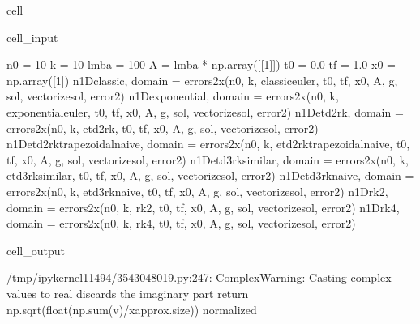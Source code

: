 \documentclass[letterpaper,10pt,english]{jupyterBook}
\begin{document}
\begin{sphinxuseclass}{cell}\begin{sphinxVerbatimInput}

\begin{sphinxuseclass}{cell_input}
\begin{sphinxVerbatim}[commandchars=\\\{\}]
n0 = 10
k = 10
lmba = 100
A = lmba * np.array([[1]])
t0 = 0.0
tf = 1.0
x0 = np.array([1])
n\PYGZus{}1D\PYGZus{}classic, domain = errors\PYGZus{}2x(n0, k, classic\PYGZus{}euler, t0, tf, x0, A, g, sol, vectorize\PYGZus{}sol, error\PYGZus{}2)
n\PYGZus{}1D\PYGZus{}exponential, domain = errors\PYGZus{}2x(n0, k, exponential\PYGZus{}euler, t0, tf, x0, A, g, sol, vectorize\PYGZus{}sol, error\PYGZus{}2)
n\PYGZus{}1D\PYGZus{}etd2rk, domain = errors\PYGZus{}2x(n0, k, etd2rk, t0, tf, x0, A, g, sol, vectorize\PYGZus{}sol, error\PYGZus{}2)
n\PYGZus{}1D\PYGZus{}etd2rk\PYGZus{}trapezoidal\PYGZus{}naive, domain = errors\PYGZus{}2x(n0, k, etd2rk\PYGZus{}trapezoidal\PYGZus{}naive, t0, tf, x0, A, g, sol, vectorize\PYGZus{}sol, error\PYGZus{}2)
n\PYGZus{}1D\PYGZus{}etd3rk\PYGZus{}similar, domain = errors\PYGZus{}2x(n0, k, etd3rk\PYGZus{}similar, t0, tf, x0, A, g, sol, vectorize\PYGZus{}sol, error\PYGZus{}2)
n\PYGZus{}1D\PYGZus{}etd3rk\PYGZus{}naive, domain = errors\PYGZus{}2x(n0, k, etd3rk\PYGZus{}naive, t0, tf, x0, A, g, sol, vectorize\PYGZus{}sol, error\PYGZus{}2)
n\PYGZus{}1D\PYGZus{}rk2, domain = errors\PYGZus{}2x(n0, k, rk2, t0, tf, x0, A, g, sol, vectorize\PYGZus{}sol, error\PYGZus{}2)
n\PYGZus{}1D\PYGZus{}rk4, domain = errors\PYGZus{}2x(n0, k, rk4, t0, tf, x0, A, g, sol, vectorize\PYGZus{}sol, error\PYGZus{}2)
\end{sphinxVerbatim}

\end{sphinxuseclass}\end{sphinxVerbatimInput}
\begin{sphinxVerbatimOutput}

\begin{sphinxuseclass}{cell_output}
\begin{sphinxVerbatim}[commandchars=\\\{\}]
/tmp/ipykernel\PYGZus{}11494/3543048019.py:247: ComplexWarning: Casting complex values to real discards the imaginary part
  return np.sqrt(float(np.sum(v)/x\PYGZus{}approx.size)) \PYGZsh{}normalized
\end{sphinxVerbatim}

\end{sphinxuseclass}\end{sphinxVerbatimOutput}

\end{sphinxuseclass}
\end{document}
